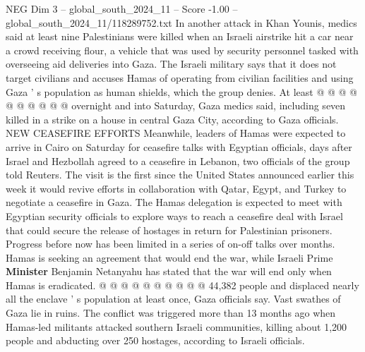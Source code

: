 \begin{textsample}{NEG Dim 3 – global\_south\_2024\_11 – Score -1.00 – global\_south\_2024\_11/118289752.txt}
In another attack in Khan Younis, medics said at least nine Palestinians were killed when an Israeli airstrike hit a car near a crowd receiving flour, a vehicle that was used by security personnel tasked with overseeing aid deliveries into Gaza.
The Israeli military says that it does not target civilians and accuses Hamas of operating from civilian facilities and using Gaza ' s population as human shields, which the group denies.
At least @ @ @ @ @ @ @ @ @ @ overnight and into Saturday, Gaza medics said, including seven killed in a strike on a house in central Gaza City, according to Gaza officials.
NEW CEASEFIRE EFFORTS Meanwhile, leaders of Hamas were expected to arrive in Cairo on Saturday for ceasefire talks with Egyptian officials, days after Israel and Hezbollah agreed to a ceasefire in Lebanon, two officials of the group told Reuters.
The visit is the first since the United States announced earlier this week it would revive efforts in collaboration with Qatar, Egypt, and Turkey to negotiate a ceasefire in Gaza.
The Hamas delegation is expected to meet with Egyptian security officials to explore ways to reach a ceasefire deal with Israel that could secure the release of hostages in return for Palestinian prisoners.
Progress before now has been limited in a series of on-off talks over months.
Hamas is seeking an agreement that would end the war, while Israeli Prime \textbf{Minister} Benjamin Netanyahu has stated that the war will end only when Hamas is eradicated. @ @ @ @ @ @ @ @ @ @ 44,382 people and displaced nearly all the enclave ' s population at least once, Gaza officials say.
Vast swathes of Gaza lie in ruins.
The conflict was triggered more than 13 months ago when Hamas-led militants attacked southern Israeli communities, killing about 1,200 people and abducting over 250 hostages, according to Israeli officials.

\end{textsample}
